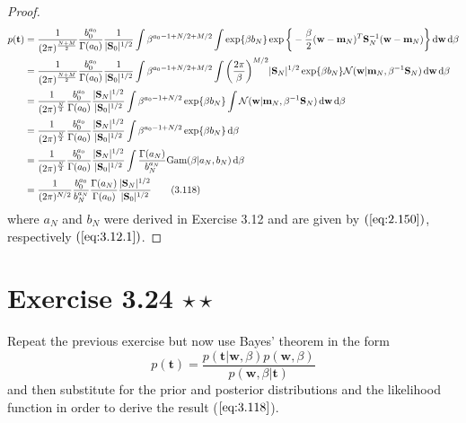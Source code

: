\begin{proof}
\begin{align*}
        p(\mathbf{t}) 
        &= \frac{1}{(2\pi)^{\frac{N + M}{2}}}\frac{b_0^{a_0}}{\Gamma(a_0)}
         \frac{1}{|\mathbf{S}_0|^{1/2}} 
        \int \beta^{a_0 - 1 + N/2 + M/2} 
        \int \exp{\beta b_N}\exp\bigg\{-\frac{\beta}{2}(\mathbf{w} 
            - \mathbf{m}_N)^T\mathbf{S}_N^{-1}
            (\mathbf{w} - \mathbf{m}_N)\bigg\} \diff \mathbf{w} \diff \beta \\
        &= \frac{1}{(2\pi)^{\frac{N + M}{2}}}\frac{b_0^{a_0}}{\Gamma(a_0)}
         \frac{1}{|\mathbf{S}_0|^{1/2}} 
        \int \beta^{a_0 - 1+ N/2 + M/2} 
        \int \bigg(\frac{2\pi}{\beta}\bigg)^{M/2} |\mathbf{S}_N|^{1/2}  
        \exp\{\beta b_N\}
        \mathcal{N}(\mathbf{w} | \mathbf{m}_N, \beta^{-1}\mathbf{S}_N)
        \diff \mathbf{w} \diff \beta \\
        &= \frac{1}{(2\pi)^{\frac{N}{2}}}\frac{b_0^{a_0}}{\Gamma(a_0)}
        \frac{|\mathbf{S}_N|^{1/2}}{|\mathbf{S}_0|^{1/2}} 
        \int \beta^{a_0 - 1 + N/2} 
        \exp\{\beta b_N\}
        \int\mathcal{N}(\mathbf{w} | \mathbf{m}_N, \beta^{-1}\mathbf{S}_N)
        \diff \mathbf{w} \diff \beta \\
        &= \frac{1}{(2\pi)^{\frac{N}{2}}}\frac{b_0^{a_0}}{\Gamma(a_0)}
        \frac{|\mathbf{S}_N|^{1/2}}{|\mathbf{S}_0|^{1/2}} 
        \int \beta^{a_0 - 1 + N/2} 
        \exp\{\beta b_N\} \diff \beta \\
        &= \frac{1}{(2\pi)^{\frac{N}{2}}}\frac{b_0^{a_0}}{\Gamma(a_0)}
        \frac{|\mathbf{S}_N|^{1/2}}{|\mathbf{S}_0|^{1/2}} 
        \int\frac{\Gamma(a_N)}{b_N^{a_N}} \text{Gam}(\beta | a_N, b_N) \diff \beta \\
        &= \frac{1}{(2\pi)^{N / 2}} \frac{b_0^{a_0}}{b_N^{a_N}}
        \frac{\Gamma(a_N)}{\Gamma(a_0)} \frac{|\mathbf{S}_N|^{1/2}}{|\mathbf{S}_0|^{1/2}}
        \tag{3.118}
    \end{align*}
    where $a_N$ and $b_N$ were derived in Exercise 3.12 and are
    given by $(\ref{eq:2.150})$, respectively $(\ref{eq:3.12.1})$.
\end{proof}

\section*{Exercise 3.24 $\star \star$}
Repeat the previous exercise but now use Bayes' theorem in 
the form
\begin{equation}\label{eq:3.119}\tag{3.119}
    p(\mathbf{t}) 
    = \frac{p(\mathbf{t} | \mathbf{w}, \beta)p(\mathbf{w}, \beta)}
        {p(\mathbf{w}, \beta | \mathbf{t})}
\end{equation}
and then substitute for the prior and posterior distributions and 
the likelihood function in order to derive the result ($\ref{eq:3.118}$).

